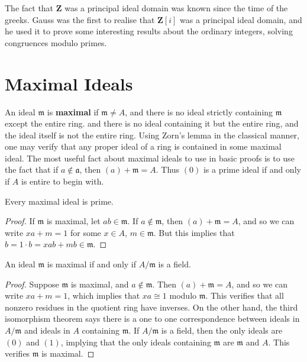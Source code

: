 The fact that $\mathbf{Z}$ was a principal ideal domain was known since the time of the greeks. Gauss was the first to realise that $\mathbf{Z}[i]$ was a principal ideal domain, and he used it to prove some interesting results about the ordinary integers, solving congruences modulo primes.

\section{Maximal Ideals}

An ideal $\mathfrak{m}$ is {\bf maximal} if $\mathfrak{m} \neq A$, and there is no ideal strictly containing $\mathfrak{m}$ except the entire ring. and there is no ideal containing it but the entire ring, and the ideal itself is not the entire ring. Using Zorn's lemma in the classical manner, one may verify that any proper ideal of a ring is contained in some maximal ideal. The most useful fact about maximal ideals to use in basic proofs is to use the fact that if $a \not \in \mathfrak{a}$, then $(a) + \mathfrak{m} = A$. Thus $(0)$ is a prime ideal if and only if $A$ is entire to begin with.

\begin{theorem}
    Every maximal ideal is prime.
\end{theorem}
\begin{proof}
    If $\mathfrak{m}$ is maximal, let $ab \in \mathfrak{m}$. If $a \not \in \mathfrak{m}$, then $(a) + \mathfrak{m} = A$, and so we can write $xa + m = 1$ for some $x \in A$, $m \in \mathfrak{m}$. But this implies that $b = 1 \cdot b = xab + mb \in \mathfrak{m}$.
\end{proof}

\begin{theorem}
    An ideal $\mathfrak{m}$ is maximal if and only if $A/\mathfrak{m}$ is a field.
\end{theorem}
\begin{proof}
    Suppose $\mathfrak{m}$ is maximal, and $a \not \in \mathfrak{m}$. Then $(a) + \mathfrak{m} = A$, and so we can write $xa + m = 1$, which implies that $xa \cong 1$ modulo $\mathfrak{m}$. This verifies that all nonzero residues in the quotient ring have inverses. On the other hand, the third isomorphism theorem says there is a one to one correspondence between ideals in $A/\mathfrak{m}$ and ideals in $A$ containing $\mathfrak{m}$. If $A/\mathfrak{m}$ is a field, then the only ideals are $(0)$ and $(1)$, implying that the only ideals containing $\mathfrak{m}$ are $\mathfrak{m}$ and $A$. This verifies $\mathfrak{m}$ is maximal.
\end{proof}

